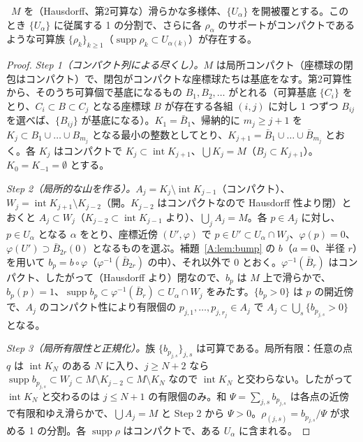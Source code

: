 \begin{thm}[1 の分割の存在]\label{A:thm:pou}
\tP\ $M$ を（Hausdorff、第2可算な）滑らかな多様体、$\{U_\alpha\}$ を開被覆とする。このとき $\{U_\alpha\}$ に従属する 1 の分割で、さらに各 $\rho_\alpha$ のサポートがコンパクトであるような可算族 $\{\rho_k\}_{k\ge1}$（$\operatorname{supp}\rho_k\subset U_{\alpha(k)}$）が存在する。
\end{thm}
\begin{proof}
\emph{Step 1（コンパクト列による尽くし）。}$M$ は局所コンパクト（座標球の閉包はコンパクト）で、閉包がコンパクトな座標球たちは基底をなす。第2可算性から、そのうち可算個で基底になるもの $B_1,B_2,\dots$ がとれる（可算基底 $\{C_i\}$ をとり、$C_i\subset B\subset C_j$ となる座標球 $B$ が存在する各組 $(i,j)$ に対し 1 つずつ $B_{ij}$ を選べば、$\{B_{ij}\}$ が基底になる）。$K_1=\bar B_1$、帰納的に $m_j\ge j+1$ を $K_j\subset B_1\cup\dots\cup B_{m_j}$ となる最小の整数としてとり、$K_{j+1}=\bar B_1\cup\dots\cup\bar B_{m_j}$ とおく。各 $K_j$ はコンパクトで $K_j\subset\operatorname{int}K_{j+1}$、$\bigcup K_j=M$（$B_j\subset K_{j+1}$）。$K_0=K_{-1}=\emptyset$ とする。

\emph{Step 2（局所的な山を作る）。}$A_j=K_j\setminus\operatorname{int}K_{j-1}$（コンパクト）、$W_j=\operatorname{int}K_{j+1}\setminus K_{j-2}$（開。$K_{j-2}$ はコンパクトなので Hausdorff 性より閉）とおくと $A_j\subset W_j$（$K_{j-2}\subset\operatorname{int}K_{j-1}$ より）、$\bigcup_jA_j=M$。各 $p\in A_j$ に対し、$p\in U_\alpha$ となる $\alpha$ をとり、座標近傍 $(U',\varphi)$ で $p\in U'\subset U_\alpha\cap W_j$、$\varphi(p)=0$、$\varphi(U')\supset\bar B_{2r}(0)$ となるものを選ぶ。補題~\ref{A:lem:bump} の $b$（$a=0$、半径 $r$）を用いて $b_p=b\circ\varphi$（$\varphi^{-1}(\bar B_{2r})$ の中）、それ以外で $0$ とおく。$\varphi^{-1}(\bar B_r)$ はコンパクト、したがって（Hausdorff より）閉なので、$b_p$ は $M$ 上で滑らかで、$b_p(p)=1$、$\operatorname{supp}b_p\subset\varphi^{-1}(\bar B_r)\subset U_\alpha\cap W_j$ をみたす。$\{b_p>0\}$ は $p$ の開近傍で、$A_j$ のコンパクト性により有限個の $p_{j,1},\dots,p_{j,r_j}\in A_j$ で $A_j\subset\bigcup_s\{b_{p_{j,s}}>0\}$ となる。

\emph{Step 3（局所有限性と正規化）。}族 $\{b_{p_{j,s}}\}_{j,s}$ は可算である。局所有限：任意の点 $q$ は $\operatorname{int}K_N$ のある $N$ に入り、$j\ge N+2$ なら $\operatorname{supp}b_{p_{j,s}}\subset W_j\subset M\setminus K_{j-2}\subset M\setminus K_N$ なので $\operatorname{int}K_N$ と交わらない。したがって $\operatorname{int}K_N$ と交わるのは $j\le N+1$ の有限個のみ。和 $\Psi=\sum_{j,s}b_{p_{j,s}}$ は各点の近傍で有限和ゆえ滑らかで、$\bigcup A_j=M$ と Step 2 から $\Psi>0$。$\rho_{(j,s)}=b_{p_{j,s}}/\Psi$ が求める 1 の分割。各 $\operatorname{supp}\rho$ はコンパクトで、ある $U_\alpha$ に含まれる。
\end{proof}
